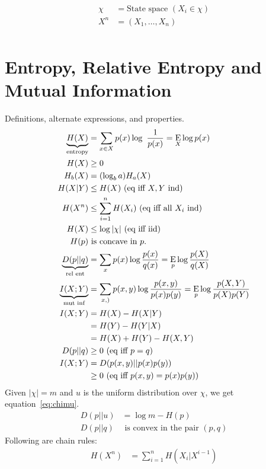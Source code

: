 \documentclass[10pt]{article}
\DeclareMathOperator*{\E}{\mbox{\text{E}}}
\begin{document}
\begin{tiny}
\begin{multicols}{3}

\begin{align*}
\chi &= \text{State space } (X_i \in \chi) \\
X^n &=(X_1,\ldots,X_n) \\
\end{align*}
\section*{Entropy, Relative Entropy and Mutual Information}
Definitions, alternate expressions, and properties.
\begin{align}
    \underbrace{H(X)}_\text{entropy}&= \sum_{x\in X} p(x) \log\ \frac{1}{p(x)}
    = \E_X \log p(x) \label{defn: entropy}\\
H(X)& \geq 0 \\
H_b(X)&= (\log_b a)H_a(X) \\
H(X|Y)& \leq  H(X)\text{ (eq iff $X,Y$ ind)} \label{eq: H cond}\\
H(X^n)& \leq \sum_{i=1}^n H(X_i)\text{ (eq iff all $X_i$ ind)} \label{eq:jointsum}\\
H(X)&\leq  \log |\chi|  \text{ (eq iff iid) }\label{eq:alphabetentropy}\\
H(p)&\text{ is concave in $p$.}\\
\underbrace{D(p||q)}_\text{rel ent} & = \sum_x p(x) \log \frac{p(x)}{q(x)}=\E_p\log \frac{p(X)}{q(X)}\\
\underbrace{I(X;Y)}_\text{mut inf} & = \sum_{x,)} p(x,y) \log \frac{p(x,y)}{p(x)p(y)} = \E_p \log \frac{p(X,Y)}{p(X)p(Y)}\\
I(X;Y)&=H(X)-H(X|Y)\\
&=H(Y)-H(Y|X)\\
&=H(X)+H(Y)-H(X,Y)\\
D(p||q)&\geq 0 \text{ (eq iff $p=q$)}\\
I(X;Y)&=D(p(x,y)||p(x)p(y))\\
	&\geq 0 \text{ (eq iff $p(x,y)=p(x)p(y)$)}
\end{align}
Given $|\chi|=m$ and $u$ is the uniform distribution over $\chi$, we get equation~\ref{eq:chimu}.
\begin{align}
D(p||u)&=\log m - H(p)\label{eq:chimu}\\
D(p||q)&\text{ is convex in the pair }(p,q)
\end{align}
Following are chain rules:
\begin{align}
H(X^n)&=\sum_{i=1}^n H(X_i|X^{i-1})\\

\end{align}
\end{multicols}
\end{tiny}
\end{document}
